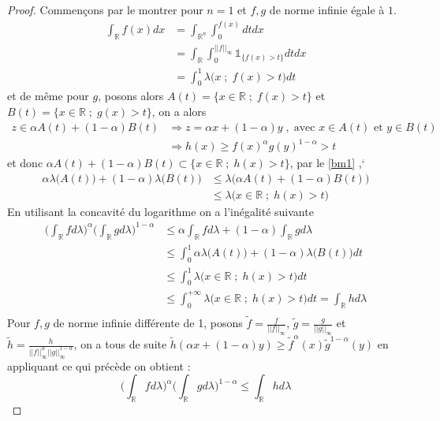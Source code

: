 \documentclass[12pt]{article}
\theoremstyle{definition}
\begin{document}
\begin{proof}
	Commençons par le montrer pour $n=1$ et $f,g$ de norme infinie égale à $1$.
	\begin{align*}
	\int_{\mathbb{R}}f(x) dx &=\int_{\mathbb{R}^n}\int_{0}^{f(x)}dt dx\\
	&=\int_{\mathbb{R}}\int_{0}^{||f||_\infty}\mathbb{1}_{\{f(x)>t\}} dt dx\\
	&=\int_{0}^{1}\lambda\big(x\;;\;f(x)>t\big)dt
	\end{align*}
	et de même pour $g$, posons alors $A(t)=\Big\{x\in\mathbb{R}\;;\;f(x)>t\Big\}$ et $B(t)= \Big\{x\in\mathbb{R}\;;\;g(x)>t\Big\}$, on a alors 
	\begin{align*}
	z\in \alpha A(t) + (1-\alpha)B(t) &\Rightarrow z=\alpha x +(1-\alpha)y \; , \; \text{avec $x\in A(t)$ et $y\in B(t)$}\\
	&\Rightarrow h(x)\geq f(x)^{\alpha}g(y)^{1-\alpha}>t
	\end{align*}
	et donc $\alpha A(t) + (1-\alpha)B(t)\subset \Big\{x\in\mathbb{R}\;;\;h(x)>t\Big\}$, par le \cref{bm1} ,`
	\begin{align*}
	\alpha\lambda\big(A(t)\big)+(1-\alpha)\lambda(B(t)\big)&\leq \lambda\Big(\alpha A(t) + (1-\alpha)B(t)\Big)\\
	&\leq \lambda\Big(x\in\mathbb{R}\;;\; h(x)>t\Big)
	\end{align*}
	En utilisant la concavité du logarithme on a l'inégalité suivante 
	\begin{align*}
	\Big(\int_{\mathbb{R}}fd\lambda\Big)^{\alpha}\Big(\int_{\mathbb{R}}g d\lambda\Big)^{1-\alpha}&\leq \alpha \int_{\mathbb{R}}fd\lambda +(1-\alpha)\int_{\mathbb{R}}g d\lambda\\
	&\leq \int_{0}^{1}\alpha\lambda\big(A(t)\big)+(1-\alpha)\lambda\big(B(t)\big)dt\\
	&\leq \int_{0}^{1}\lambda\Big(x\in\mathbb{R}\;;\; h(x)>t\Big)dt\\
	&\leq \int_{0}^{+\infty}\lambda\Big(x\in\mathbb{R}\;;\; h(x)>t\Big)dt=\int_{\mathbb{R}}hd\lambda\\
	\end{align*}
	Pour $f,g$ de norme infinie différente de 1, posons $\tilde{f}=\frac{f}{||f||_\infty}$, $\tilde{g}=\frac{g}{||g||_\infty}$ et $\tilde{h}=\frac{h}{||f||_\infty^{\alpha}||g||_\infty^{1-\alpha}}$, on a tous de suite $\tilde{h}(\alpha x + (1-\alpha)y)\geq \tilde{f}^{\alpha}(x)\tilde{g}^{1-\alpha}(y)$ en appliquant ce qui précède on obtient :
	\begin{equation*}
	\Big(\int_{\mathbb{R}}fd\lambda\Big)^{\alpha}\Big(\int_{\mathbb{R}}g d\lambda\Big)^{1-\alpha}\leq \int_{\mathbb{R}}hd\lambda

\end{equation*}
\end{proof}
\end{document}
